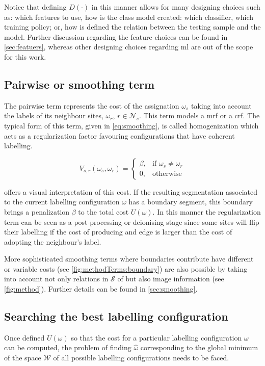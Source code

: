 Notice that defining $D(\cdot)$ in this manner allows for many designing choices such as: which features to use, how is the class model created: which classifier, which training policy; or, how is defined the relation between the testing sample and the model.
Further discussion regarding the feature choices can be found in \cref{sec:featuers}, whereas other designing choices regarding \ac{ml} are out of the scope for this work.

\subsection{Pairwise or smoothing term} \label{sec:method:mrfTerm}
 
The pairwise term represents the cost of the assignation $\omega_s$ taking into account the labels of its neighbour sites, $\omega_r$, $r \in \mathcal{N}_{s}$. 
This term models a \ac{mrf} or a \ac{crf}.
The typical form of this term, given in \cref{eq:smoothing}, is called homogenization which acts as a regularization factor favouring configurations that have coherent labelling.

\begin{equation}
V_{s,r}(\omega_s,\omega_r) = 
\begin{cases}
    \beta, & \text{if } \omega_s \ne \omega_r\\
    0,              & \text{otherwise}
\end{cases}
\label{eq:smoothing}
\end{equation}

 offers a visual interpretation of this cost.
If the resulting segmentation associated to the current labelling configuration $\omega$ has a boundary segment, this boundary brings a penalization $\beta$ to the total cost $U(\omega)$.
In this manner the regularization term can be seen as a post-processing or deionising stage since some sites will flip their labelling if the cost of producing and edge is larger than the cost of adopting the neighbour's label. 

More sophisticated smoothing terms where boundaries contribute have different or variable costs (see \cref{fig:methodTerms:boundary}) are also possible by taking into account not only relations in $\mathcal{S}$ of but also image information (see \cref{fig:method}). 
Further details can be found in \cref{sec:smoothing}.

\subsection{Searching the best labelling configuration}
Once defined $U(\omega)$ so that the cost for a particular labelling configuration $\omega$ can be computed, the problem of finding $\hat{\omega}$ corresponding to the global minimum of the space $\mathcal{W}$ of all possible labelling configurations needs to be faced. 

